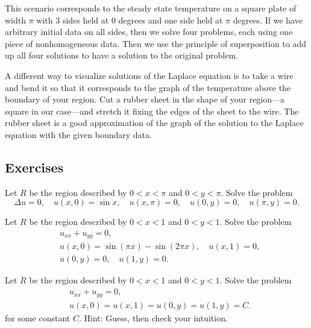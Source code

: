 \documentclass[12pt]{book}
\begin{document}
This scenario
corresponds to the steady state temperature on a square plate of width $\pi$
with 3 sides held at 0 degrees and one side held at $\pi$ degrees.
If we have arbitrary initial data on all sides, then we solve four problems,
each using one piece of nonhomogeneous data.  Then we use the principle of
superposition to add up all four solutions to have a solution to the
original problem.

A different
way to visualize solutions of the Laplace equation is to
take a wire and bend
it so that it corresponds to the graph of the
temperature above the boundary of your region.  Cut a rubber sheet in
the shape of your region---a square in our case---and stretch it
fixing the edges of the sheet to the wire.
The rubber sheet is a good approximation of the graph of the solution to
the Laplace equation with the given boundary data.

\subsection{Exercises}

\begin{exercise}
Let $R$ be the region described by $0 < x < \pi$ and $0 < y < \pi$.
Solve the problem
\begin{equation*}
\Delta u = 0, \quad u(x,0) = \sin x, \quad u(x,\pi) = 0,
\quad u(0,y) = 0, 
\quad u(\pi,y) = 0 .
\end{equation*}
\end{exercise}

\begin{exercise}
Let $R$ be the region described by $0 < x < 1$ and $0 < y < 1$.
Solve the problem
\begin{align*}
& u_{xx} + u_{yy} = 0, \\
& u(x,0) = \sin (\pi x) - \sin (2\pi x), \quad u(x,1) = 0, \\
& u(0,y) = 0, \quad u(1,y) = 0 .
\end{align*}
\end{exercise}

\begin{exercise}
Let $R$ be the region described by $0 < x < 1$ and $0 < y < 1$.
Solve the problem
\begin{align*}
& u_{xx} + u_{yy} = 0, \\
& u(x,0) = u(x,1) = u(0,y) = u(1,y) = C .
\end{align*}
for some constant $C$.  Hint: Guess, then check your intuition.
\end{exercise}
\end{document}
